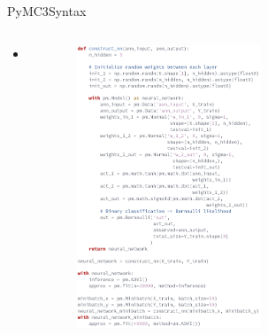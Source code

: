 \documentclass[AERbeamer%
              ,optEnglish%
              ,optBiber%
              ,optBibstyleAlphabetic%
              ,optBeamerClassicFormat%
              ]{AERlatex}%
\begin{document}
\begin{frame}[c]{PyMC3}{Syntax}
    \centering
    \begin{columns}[T]
        \begin{column}{0.4\textwidth}
            \centering
            \begin{itemize}
                \item 
            \end{itemize}
        \end{column}
        \begin{column}{0.58\textwidth}
            \centering
            \begin{figure}
                \centering
                \includegraphics[width=0.54\textwidth]{PyMC3Syntax.png}
            \end{figure}
        \end{column}
    \end{columns}
\end{frame}
\end{document}
